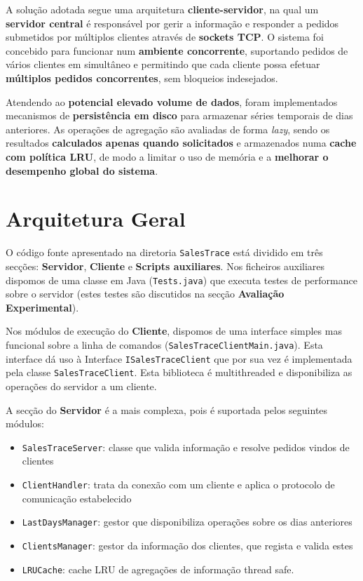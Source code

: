 \documentclass[11pt, a4paper, fleqn]{article}
\begin{document}
	A solução adotada segue uma arquitetura \textbf{cliente-servidor}, na qual um \textbf{servidor central} é responsável por gerir a informação e responder a pedidos submetidos por múltiplos clientes através de \textbf{sockets TCP}. O sistema foi concebido para funcionar num \textbf{ambiente concorrente}, suportando pedidos de vários clientes em simultâneo e permitindo que cada cliente possa efetuar \textbf{múltiplos pedidos concorrentes}, sem bloqueios indesejados.
	
	Atendendo ao \textbf{potencial elevado volume de dados}, foram implementados mecanismos de \textbf{persistência em disco} para armazenar séries temporais de dias anteriores. As operações de agregação são avaliadas de forma \textit{lazy}, sendo os resultados \textbf{calculados apenas quando solicitados} e armazenados numa \textbf{cache com política LRU}, de modo a limitar o uso de memória e a \textbf{melhorar o desempenho global do sistema}.
	
	
	\section{Arquitetura Geral}
	
	O código fonte apresentado na diretoria \texttt{SalesTrace} está dividido em três secções: \textbf{Servidor}, \textbf{Cliente} e \textbf{Scripts auxiliares}. Nos ficheiros auxiliares dispomos de uma classe em Java (\texttt{Tests.java}) que executa testes de performance sobre o servidor (estes testes são discutidos na secção \textbf{Avaliação Experimental}).
	
	Nos módulos de execução do \textbf{Cliente}, dispomos de uma interface simples mas funcional sobre a linha de comandos (\texttt{SalesTraceClientMain.java}). Esta interface dá uso à Interface \texttt{ISalesTraceClient} que por sua vez é implementada pela classe \texttt{SalesTraceClient}. Esta biblioteca é multithreaded e disponibiliza as operações do servidor a um cliente.
	
	A secção do \textbf{Servidor} é a mais complexa, pois é suportada pelos seguintes módulos:
	\begin{itemize}
		\item \texttt{SalesTraceServer}: classe que valida informação e resolve pedidos vindos de clientes
		\item \texttt{ClientHandler}: trata da conexão com um cliente e aplica o protocolo de comunicação estabelecido
		\item \texttt{LastDaysManager}: gestor que disponibiliza operações sobre os dias anteriores
		\item \texttt{ClientsManager}: gestor da informação dos clientes, que regista e valida estes
		\item \texttt{LRUCache}: cache LRU de agregações de informação thread safe.
	\end{itemize}
	
\end{document}
